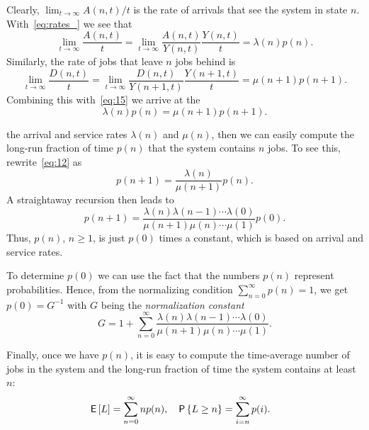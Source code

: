 Clearly, $\lim_{t\to\infty} A(n,t)/ t$ is the rate of arrivals that see the system in state $n$. With~\cref{eq:rates_} we see that
\begin{equation*}
\lim_{t\to\infty} \frac{A(n,t)}t = \lim_{t\to\infty} \frac{A(n,t)}{Y(n,t)}\frac{Y(n,t)}t = \lambda(n) p(n).
\end{equation*}
Similarly, the rate of jobs that leave $n$ jobs behind is
\begin{equation*}
\lim_{t\to\infty} \frac{D(n,t)}t = \lim_{t\to\infty} \frac{D(n,t)}{Y(n+1,t)}\frac{Y(n+1,t)}t = \mu(n+1) p(n+1).
\end{equation*}
Combining this with~\cref{eq:15} we arrive at the 
\begin{equation}\label{eq:12}
 \lambda(n) p(n) = \mu(n+1)p(n+1).
\end{equation}


 the arrival and service rates $\lambda(n)$ and $\mu(n)$, 
then we can easily compute the long-run fraction of time $p(n)$ that the system contains $n$ jobs.
To see this, rewrite~\cref{eq:12} as
\begin{equation}\label{eq:25}
 p(n+1) = \frac{\lambda(n)}{\mu(n+1)}p(n).
\end{equation}
A straightaway recursion then leads to
\begin{equation*}
 p(n+1) = \frac{\lambda(n)\lambda(n-1)\cdots \lambda(0)}{\mu(n+1)\mu(n)\cdots \mu(1)}p(0).
\end{equation*}
Thus, $p(n)$, $n\geq 1$, is just $p(0)$ times a constant, which is based on  arrival and service rates.

To determine $p(0)$ we can use the fact that the numbers $p(n)$ represent probabilities.
Hence, from the normalizing condition $\sum_{n=0}^\infty p(n)=1$, we get $p(0) = G^{-1}$ with
$G$ being the \emph{normalization constant}
\begin{equation} \label{eq:20}
G = 1+\sum_{n=0}^\infty \frac{\lambda(n)\lambda(n-1)\cdots\lambda(0)}{\mu(n+1)\mu(n)\cdots \mu(1)}.
\end{equation}

Finally, once we have $p(n)$, it is easy to compute  the time-average number of jobs in the system and the long-run fraction of time the system contains at least $n$:
\begin{align*}
\,\mathsf{E}\left[L\right] &= \sum_{n=0}^\infty n p(n), & \,\mathsf{P}\left\{L \geq n\right\} &= \sum_{i=n}^\infty p(i).
\end{align*}


